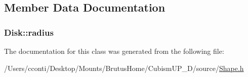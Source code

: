 \subsection{Member Data Documentation}
\hypertarget{class_disk_ae6a9adac6c5dd96d63d0a3345f90499d}{}
\subsubsection[{radius}]{ Disk\+::radius\hspace{0.3cm}{\ttfamily [protected]}}\label{class_disk_ae6a9adac6c5dd96d63d0a3345f90499d}


The documentation for this class was generated from the following file\+:\begin{DoxyCompactItemize}
\item 
/\+Users/cconti/\+Desktop/\+Mounts/\+Brutus\+Home/\+Cubism\+U\+P\+\_\+D/source/\hyperlink{_shape_8h}{Shape.\+h}\end{DoxyCompactItemize}
